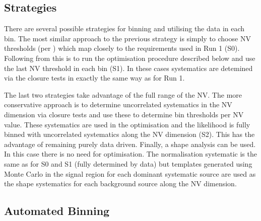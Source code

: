 \subsection{Strategies}

There are several possible strategies for binning and utilising the data in each \scalhtcat bin. The most similar approach to the previous strategy is simply to choose NV thresholds (per \scalht) which map closely to the \alphat requirements used in Run 1 (S0). Following from this is to run the optimisation procedure described below and use the last NV threshold in each \scalhtcat bin (S1). In these cases systematics are detemined via the closure tests in exactly the same way as for Run 1.

The last two strategies take advantage of the full range of the NV. The more conservative approach is to determine uncorrelated systematics in the NV dimension via closure tests and use these to determine bin thresholds per NV value. These systematics are used in the optimisation and the likelihood is fully binned with uncorrelated systematics along the NV dimension (S2). This has the advantage of remaining purely data driven. Finally, a shape analysis can be used. In this case there is no need for optimisation. The normalisation systematic is the same as for S0 and S1 (fully determined by data) but templates generated using Monte Carlo in the signal region for each dominant systematic source are used as the shape systematics for each background source along the NV dimension.



\subsection{Automated Binning}

